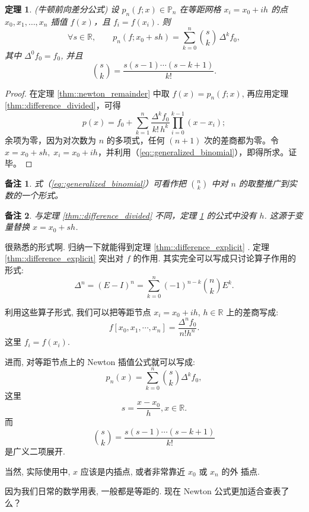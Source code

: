\documentclass[a4paper]{ctexart}
\newtheorem{theorem}{定理}
\newtheorem{remark}{备注}
\numberwithin{theorem}{section}
\numberwithin{equation}{section}
\numberwithin{figure}{section}
\numberwithin{remark}{section}
\begin{document}
\begin{theorem}
    \label{thm::newton_forward}
    (牛顿前向差分公式)
设 $p_n(f;x)\in\mathbb{P}_n$ 在等距网格 $x_i=x_0+ih$ 的点 $x_0,x_1,\ldots,x_n$ 插值 $f(x)$，且 $f_i=f(x_i)$. 则
\begin{equation}
    \label{eq::newton_forward}
\forall s\in\mathbb{R},\qquad
p_n(f;x_0+sh)=\sum_{k=0}^{n}\binom{s}{k}\,\Delta^{k}f_0,
\end{equation}
其中 $\Delta^0 f_0=f_0$, 并且
\begin{equation}
    \label{eq::generalized_binomial}
\binom{s}{k}=\frac{s(s-1)\cdots(s-k+1)}{k!}.
\end{equation}
\end{theorem}
\begin{proof}
在定理 \ref{thm::newton_remainder} 中取 $f(x)=p_n(f;x)$, 再应用定理 \ref{thm::difference_divided}，可得
\begin{equation*}
p(x)=f_0+\sum_{k=1}^{n}\frac{\Delta^{k}f_0}{k!\,h^{k}}
\prod_{i=0}^{k-1}(x-x_i);
\end{equation*}
余项为零，因为对次数为 $n$ 的多项式，任何 $(n+1)$ 次的差商都为零。令
$x=x_0+sh,\; x_i=x_0+ih$，并利用（\ref{eq::generalized_binomial}），即得所求。证毕。
\end{proof}

\begin{remark}
式（\ref{eq::generalized_binomial}）可看作把 $\binom{n}{k}$ 中对 $n$ 的取整推广到实数的一个形式。
\end{remark}

\begin{remark}
与定理 \ref{thm::difference_divided} 不同，定理 \ref{thm::newton_forward} 的公式中没有 $h$. 这源于变量替换 $x=x_0+sh$.
\end{remark}

很熟悉的形式啊. 归纳一下就能得到定理 \ref{thm::difference_explicit} . 定理 \ref{thm::difference_explicit} 突出对 $f$ 的作用.
其实完全可以写成只讨论算子作用的形式:
$$
\Delta^n = (E - I)^n = \sum_{k = 0}^n (-1)^{n - k}{n \choose k}E^k.
$$

利用这些算子形式, 我们可以把等距节点 $x_i = x_0 + ih$, $h \in
\mathbb{R}$ 上的差商写成:
$$
f[x_0, x_1, \cdots, x_n] = \frac{\Delta^n f_0}{n! h^n}.
$$
这里 $f_i = f(x_i)$.

进而, 对等距节点上的 Newton 插值公式就可以写成:
$$
p_n(x) = \sum_{k = 0}^n {s \choose k} \Delta^k f_0,
$$
这里
$$
s = \frac{x - x_0}h, x \in \mathbb{R}.
$$
而
$$
{s \choose k} = \frac{s(s - 1)\cdots(s - k + 1)}{k!}
$$
是广义二项展开.

当然, 实际使用中, $x$ 应该是内插点, 或者非常靠近 $x_0$ 或 $x_n$ 的外
插点.

因为我们日常的数学用表, 一般都是等距的. 现在 Newton 公式更加适合查表了么？




\end{document}
